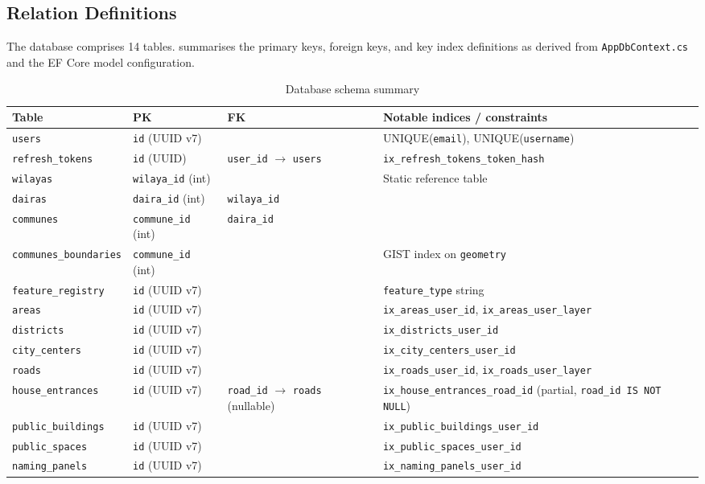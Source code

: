 \documentclass[12pt,a4paper]{article}
\theoremstyle{definition}
\theoremstyle{plain}
\theoremstyle{remark}
\begin{document}
\subsection{Relation Definitions}

The database comprises 14 tables.  summarises the
primary keys, foreign keys, and key index definitions as derived from
\texttt{AppDbContext.cs} and the EF Core model configuration.

\begin{table}[H]
\centering
\caption{Database schema summary}
\label{tab:schema}
\begin{tabularx}{\textwidth}{lllX}
\toprule
\textbf{Table} & \textbf{PK} & \textbf{FK} & \textbf{Notable indices / constraints} \\
\midrule
\texttt{users}
  & \texttt{id} (UUID v7)
  &
  & UNIQUE(\texttt{email}), UNIQUE(\texttt{username}) \\
\texttt{refresh\_tokens}
  & \texttt{id} (UUID)
  & \texttt{user\_id} $\to$ \texttt{users}
  & \texttt{ix\_refresh\_tokens\_token\_hash} \\
\texttt{wilayas}
  & \texttt{wilaya\_id} (int)
  &
  & Static reference table \\
\texttt{dairas}
  & \texttt{daira\_id} (int)
  & \texttt{wilaya\_id}
  & \\
\texttt{communes}
  & \texttt{commune\_id} (int)
  & \texttt{daira\_id}
  & \\
\texttt{communes\_boundaries}
  & \texttt{commune\_id} (int)
  &
  & GIST index on \texttt{geometry} \\
\texttt{feature\_registry}
  & \texttt{id} (UUID v7)
  &
  & \texttt{feature\_type} string \\
\texttt{areas}
  & \texttt{id} (UUID v7)
  &
  & \texttt{ix\_areas\_user\_id}, \texttt{ix\_areas\_user\_layer} \\
\texttt{districts}
  & \texttt{id} (UUID v7)
  &
  & \texttt{ix\_districts\_user\_id} \\
\texttt{city\_centers}
  & \texttt{id} (UUID v7)
  &
  & \texttt{ix\_city\_centers\_user\_id} \\
\texttt{roads}
  & \texttt{id} (UUID v7)
  &
  & \texttt{ix\_roads\_user\_id}, \texttt{ix\_roads\_user\_layer} \\
\texttt{house\_entrances}
  & \texttt{id} (UUID v7)
  & \texttt{road\_id} $\to$ \texttt{roads} (nullable)
  & \texttt{ix\_house\_entrances\_road\_id} (partial, \texttt{road\_id IS NOT NULL}) \\
\texttt{public\_buildings}
  & \texttt{id} (UUID v7)
  &
  & \texttt{ix\_public\_buildings\_user\_id} \\
\texttt{public\_spaces}
  & \texttt{id} (UUID v7)
  &
  & \texttt{ix\_public\_spaces\_user\_id} \\
\texttt{naming\_panels}
  & \texttt{id} (UUID v7)
  &
  & \texttt{ix\_naming\_panels\_user\_id} \\
\bottomrule
\end{tabularx}
\end{table}
\end{document}

